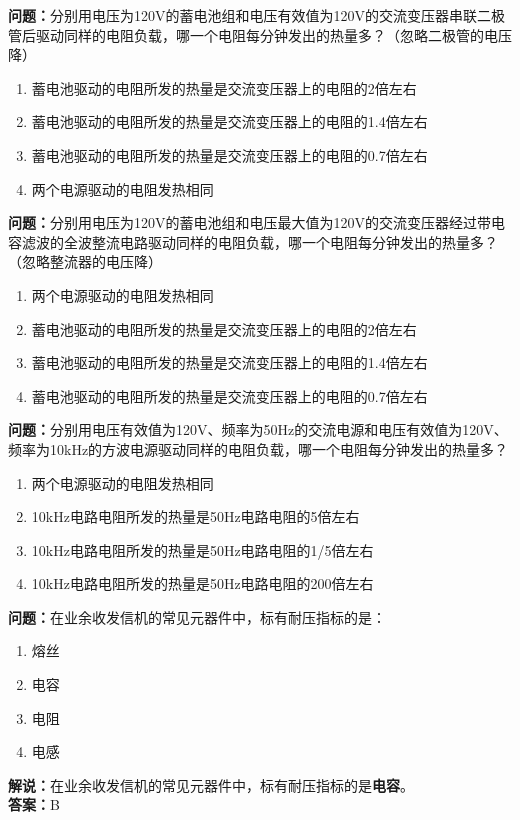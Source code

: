 \bigskip


\noindent\textbf{问题：}分别用电压为120V的蓄电池组和电压有效值为120V的交流变压器串联二极管后驱动同样的电阻负载，哪一个电阻每分钟发出的热量多？（忽略二极管的电压降）
\begin{enumerate}[label=\Alph*), leftmargin=3em]
\item 蓄电池驱动的电阻所发的热量是交流变压器上的电阻的2倍左右
\item 蓄电池驱动的电阻所发的热量是交流变压器上的电阻的1.4倍左右
\item 蓄电池驱动的电阻所发的热量是交流变压器上的电阻的0.7倍左右
\item 两个电源驱动的电阻发热相同
\end{enumerate}

\bigskip


\noindent\textbf{问题：}分别用电压为120V的蓄电池组和电压最大值为120V的交流变压器经过带电容滤波的全波整流电路驱动同样的电阻负载，哪一个电阻每分钟发出的热量多？（忽略整流器的电压降）
\begin{enumerate}[label=\Alph*), leftmargin=3em]
\item 两个电源驱动的电阻发热相同
\item 蓄电池驱动的电阻所发的热量是交流变压器上的电阻的2倍左右
\item 蓄电池驱动的电阻所发的热量是交流变压器上的电阻的1.4倍左右
\item 蓄电池驱动的电阻所发的热量是交流变压器上的电阻的0.7倍左右
\end{enumerate}

\bigskip


\noindent\textbf{问题：}分别用电压有效值为120V、频率为50Hz的交流电源和电压有效值为120V、频率为10kHz的方波电源驱动同样的电阻负载，哪一个电阻每分钟发出的热量多？
\begin{enumerate}[label=\Alph*), leftmargin=3em]
\item 两个电源驱动的电阻发热相同
\item 10kHz电路电阻所发的热量是50Hz电路电阻的5倍左右
\item 10kHz电路电阻所发的热量是50Hz电路电阻的1/5倍左右
\item 10kHz电路电阻所发的热量是50Hz电路电阻的200倍左右
\end{enumerate}

\bigskip


\noindent\textbf{问题：}在业余收发信机的常见元器件中，标有耐压指标的是：
\begin{enumerate}[label=\Alph*), leftmargin=3em]
\item 熔丝
\item 电容
\item 电阻
\item 电感
\end{enumerate}
\noindent\textbf{解说：}在业余收发信机的常见元器件中，标有耐压指标的是\textbf{电容}。\\\noindent\textbf{答案：}B

